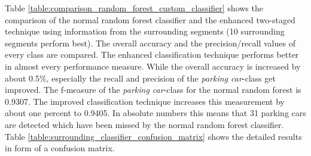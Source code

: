 \begin{table}


\caption{Comparison of the best performing random forest classifier to the best configuration of the proposed two staged classification technique  (two random forests and using 10 surrounding samples) on the filtered dataset.}
\label{table:comparison_random_forest_custom_classifier}
\end{table}
 
 
Table \ref{table:comparison_random_forest_custom_classifier} shows the comparison of the normal random forest classifier and the enhanced two-staged technique using information from the surrounding segments (10 surrounding segments perform best). The overall accuracy and the precision/recall values of every class are compared. The enhanced classification technique performs better in almost every performance measure. While the overall accuracy is increased by about 0.5\%, especially the recall and precision of the \emph{parking car}-class get improved. The f-measure of the \emph{parking car}-class for the normal random forest is 0.9307. The improved classification technique increases this measurement by about one percent to 0.9405. In absolute numbers this means that 31 parking cars are detected which have been missed by the normal random forest classifier. Table \ref{table:surrounding_classifier_confusion_matrix} shows the detailed results in form of a confusion matrix.

